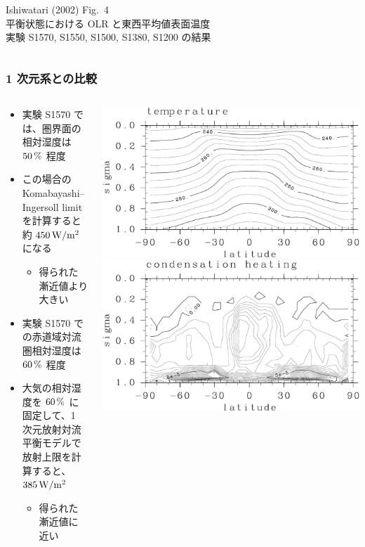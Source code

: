 \documentclass[aspectratio=149,9pt,]{beamer}
\begin{document}
\begin{frame}
\begin{columns}[T,onlytextwidth]
\begin{column}{.4\textwidth}
			\scriptsize Ishiwatari \etal (2002) Fig.\ 4\\
			平衡状態における OLR と東西平均値表面温度\\
			実験 S1570, S1550, S1500, S1380, S1200 の結果
		\end{column}
	\end{columns}
\end{frame}

\begin{frame}
	\frametitle{1 次元系との比較}
	\begin{columns}[T,onlytextwidth]
		\begin{column}{.45\textwidth}
			\begin{itemize}
				\item 実験 S1570 では、圏界面の相対湿度は \(50\hmu{\%}\) 程度
				\item この場合の Komabayashi--Ingersoll limit を計算すると約 \(450\hmu{W/m^2}\) になる
					\begin{itemize}
						\item 得られた漸近値より大きい
					\end{itemize}
				\item 実験 S1570 での赤道域対流圏相対湿度は \(60\hmu{\%}\) 程度
				\item 大気の相対湿度を \(60\hmu{\%}\) に固定して、1 次元放射対流平衡モデルで
					放射上限を計算すると、\(385\hmu{W/m^2}\)
					\begin{itemize}
						\item 得られた漸近値に近い
					\end{itemize}
			\end{itemize}
		\end{column}
		\begin{column}{.5\textwidth}
			\centering
			\includegraphics[width=.45\textwidth]{./fig/157-T-meri.kps-crop.pdf}
			\includegraphics[width=.45\textwidth]{./fig/157-Qcnd-meri.kps-crop.pdf}

\end{column}
\end{columns}
\end{frame}
\end{document}
